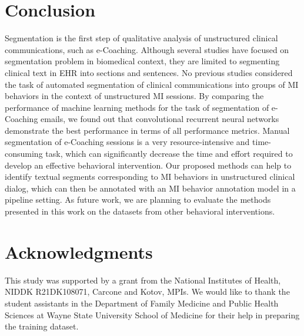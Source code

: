\documentclass{amia}
\begin{document}
 
\section*{Conclusion}

Segmentation is the first step of qualitative analysis of unstructured clinical communications, such as e-Coaching. Although several studies have focused on segmentation problem in biomedical context, they are limited to segmenting clinical text in EHR into sections and sentences. No previous studies considered the task of automated segmentation of clinical communications into groups of MI behaviors in the context of unstructured MI sessions. By comparing the performance of machine learning methods for the task of segmentation of e-Coaching emails, we found out that convolutional recurrent neural networks demonstrate the best performance in terms of all performance metrics. Manual segmentation of e-Coaching sessions is a very resource-intensive and time-consuming task, which can significantly decrease the time and effort required to develop an effective behavioral intervention. Our proposed methods can help to identify textual segments corresponding to MI behaviors in unstructured clinical dialog, which can then be annotated with an MI behavior annotation model in a pipeline setting. %
As future work, we are planning to evaluate the methods presented in this work on the datasets from other behavioral interventions.

\section*{Acknowledgments}
This study was supported by a grant from the National Institutes of Health, NIDDK R21DK108071, Carcone and Kotov, MPIs. We would like to thank the student assistants in the Department of Family Medicine and Public Health Sciences at Wayne State University School of Medicine for their help in preparing the training dataset. 



\end{document}
